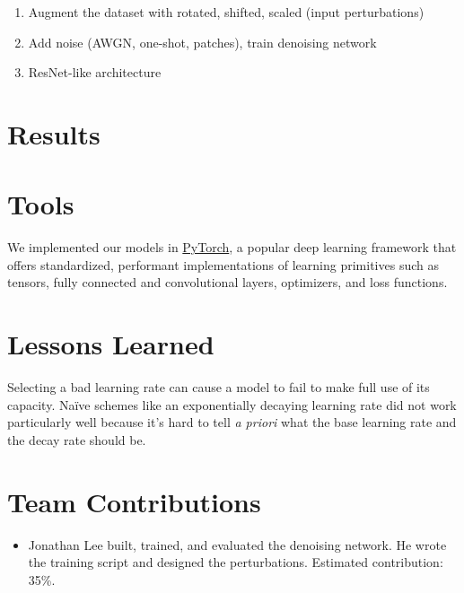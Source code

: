 \documentclass[justified]{article}
\begin{document}
  \begin{enumerate}
  \item Augment the dataset with rotated, shifted, scaled (input perturbations)
  \item Add noise (AWGN, one-shot, patches), train denoising network
  \item ResNet-like architecture
  \end{enumerate}

  \section{Results}

  \section{Tools}

  We implemented our models in \href{https://pytorch.org/}{PyTorch}, a popular deep learning framework that offers standardized, performant implementations of learning primitives such as tensors, fully connected and convolutional layers, optimizers, and loss functions.

  \section{Lessons Learned}

  Selecting a bad learning rate can cause a model to fail to make full use of its capacity.
  Na\"{i}ve schemes like an exponentially decaying learning rate did not work particularly well because it's hard to tell \textit{a priori} what the base learning rate and the decay rate should be.

  \section{Team Contributions}

  \begin{itemize}
  \item
    Jonathan Lee built, trained, and evaluated the denoising network.
    He wrote the training script and designed the perturbations.
    Estimated contribution: 35\%.
  \end{itemize}
\end{document}
